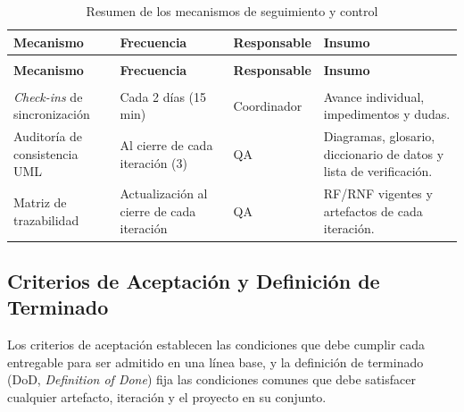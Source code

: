 {\small
\begin{xltabular}{\textwidth}{|>{\raggedright\arraybackslash}p{3.4cm}|>{\raggedright\arraybackslash}p{3.0cm}|>{\raggedright\arraybackslash}p{2.4cm}|X|}
    \caption{Resumen de los mecanismos de seguimiento y control}
    \label{tab:mecanismos_control} \\
    \hline
    \textbf{Mecanismo} & \textbf{Frecuencia} & \textbf{Responsable} & \textbf{Insumo} \\
    \hline
    \endfirsthead

     \\
    \hline
    \textbf{Mecanismo} & \textbf{Frecuencia} & \textbf{Responsable} & \textbf{Insumo} \\
    \hline
    \endhead

     \\
    \endfoot

    \endlastfoot

    \textit{Check-ins} de sincronización & Cada 2 días (15 min) & Coordinador & Avance individual, impedimentos y dudas. \\*
    \hline
    Auditoría de consistencia UML & Al cierre de cada iteración (3) & QA & Diagramas, glosario, diccionario de datos y lista de verificación. \\*
    \hline
    Matriz de trazabilidad & Actualización al cierre de cada iteración & QA & RF/RNF vigentes y artefactos de cada iteración. \\
    \hline
\end{xltabular}
}

\subsection{Criterios de Aceptación y Definición de Terminado}
\label{subsec:criterios_aceptacion}

Los criterios de aceptación establecen las condiciones que debe cumplir cada entregable para ser admitido en una línea base, y la definición de terminado (DoD, \textit{Definition of Done}) fija las condiciones comunes que debe satisfacer cualquier artefacto, iteración y el proyecto en su conjunto.

